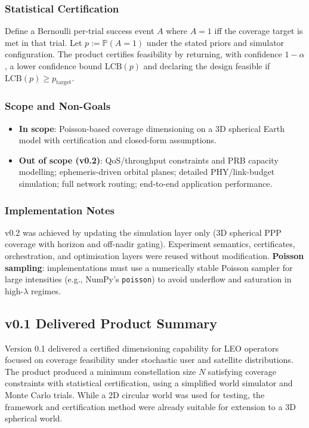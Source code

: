\documentclass[11pt,a4paper]{article}
\begin{document}
\subsubsection{Statistical Certification}
Define a Bernoulli per-trial success event $A$ where $A=1$ iff the coverage target is met in that trial.
Let $p := \mathbb{P}(A=1)$ under the stated priors and simulator configuration.
The product certifies feasibility by returning, with confidence $1-\alpha$, a lower confidence bound $\mathrm{LCB}(p)$ and
declaring the design feasible if $\mathrm{LCB}(p) \ge p_{\mathrm{target}}$.

\subsubsection{Scope and Non-Goals}
\begin{itemize}
    \item \textbf{In scope}: Poisson-based coverage dimensioning on a 3D spherical Earth model with certification and
    closed-form assumptions.
    \item \textbf{Out of scope (v0.2)}: QoS/throughput constraints and PRB capacity modelling; ephemeris-driven orbital
    planes; detailed PHY/link-budget simulation; full network routing; end-to-end application performance.
\end{itemize}

\subsubsection{Implementation Notes}
v0.2 was achieved by updating the simulation layer only (3D spherical PPP coverage with horizon and off-nadir gating).
Experiment semantics, certificates, orchestration, and optimisation layers were reused without modification.
\newline\textbf{Poisson sampling}: implementations must use a numerically stable Poisson sampler for large intensities
(e.g., NumPy's \texttt{poisson}) to avoid underflow and saturation in high-$\lambda$ regimes.


\subsection{v0.1 Delivered Product Summary}
Version 0.1 delivered a certified dimensioning capability for LEO operators focused on coverage feasibility under
stochastic user and satellite distributions. The product produced a minimum constellation size $N$ satisfying coverage
constraints with statistical certification, using a simplified world simulator and Monte Carlo trials. While a 2D circular world
was used for testing, the framework and certification method were already suitable for extension to a 3D spherical world. 
\end{document}
